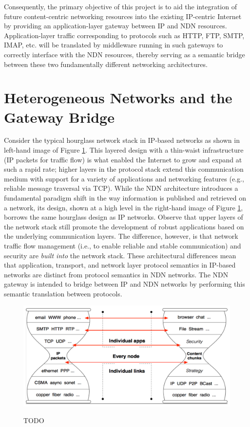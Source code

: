 \documentclass[10pt]{article}
\begin{document}
Consequently, the primary objective of this project is to aid the integration of future content-centric networking resources into the existing IP-centric Internet by providing an application-layer gateway between IP and NDN resources. Application-layer traffic corresponding to protocols such as HTTP, FTP, SMTP, IMAP, etc. will be translated by middleware running in such gateways to correctly interface with the NDN resources, thereby serving as a semantic bridge between these two fundamentally different networking architectures. 

\section{Heterogeneous Networks and the Gateway Bridge}
Consider the typical hourglass network stack in IP-based networks as shown in left-hand image of Figure \ref{fig:hourglass}. This layered design with a thin-waist infrastructure (IP packets for traffic flow) is what enabled the Internet to grow and expand at such a rapid rate; higher layers in the protocol stack extend this communication medium with support for a variety of applications and networking features (e.g., reliable message traversal via TCP). While the NDN architecture introduces a fundamental paradigm shift in the way information is published and retrieved on a network, its design, shown at a high level in the right-hand image of Figure \ref{fig:hourglass}, borrows the same hourglass design as IP networks. Observe that upper layers of the network stack still promote the development of robust applications based on the underlying communication layers. The difference, however, is that network traffic flow management (i.e., to enable reliable and stable communication) and security are \emph{built into} the network stack. These architectural differences mean that application, transport, and network layer protocol semantics in IP-based networks are distinct from protocol semantics in NDN networks. The NDN gateway is intended to bridge between IP and NDN networks by performing this semantic translation between protocols. 

\begin{figure}
\begin{center}
\includegraphics[scale=0.5]{./images/hourglass_conn.pdf}
\label{fig:hourglass}
\caption{TODO}
\end{center}
\end{figure}
\end{document}
